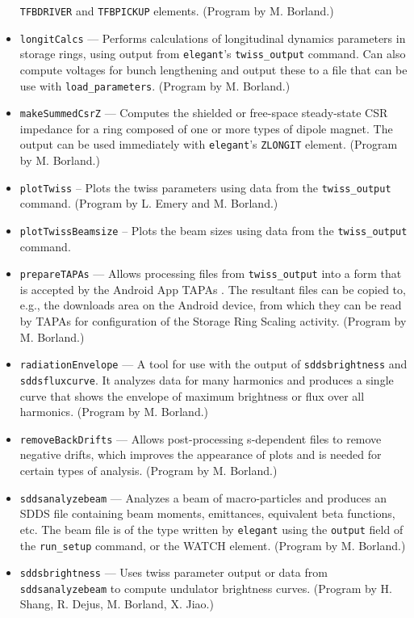 \documentclass[11pt]{article}
\begin{document}
\begin{itemize}
  \verb|TFBDRIVER| and \verb|TFBPICKUP| elements.
  (Program by M. Borland.)
\item {\tt longitCalcs} --- Performs calculations of longitudinal dynamics parameters in storage rings,
  using output from \verb|elegant|'s \verb|twiss_output| command. Can also compute voltages for
  bunch lengthening and output these to a file that can be use with \verb|load_parameters|.
  (Program by M. Borland.)
\item {\tt makeSummedCsrZ} --- Computes the shielded or free-space steady-state CSR impedance for a ring
  composed of one or more types of dipole magnet.
 The output can be used immediately with {\tt elegant}'s \verb|ZLONGIT| element.
  (Program by M. Borland.)
\item {\tt plotTwiss} -- Plots the twiss parameters using data from the \verb|twiss_output| command.
  (Program by L. Emery and M. Borland.)
\item {\tt plotTwissBeamsize} -- Plots the beam sizes using data from the \verb|twiss_output| command.
\item {\tt prepareTAPAs} --- Allows processing files from \verb|twiss_output| into a form
  that is accepted by the Android App TAPAs \cite{TAPAs}. The resultant files can be copied to, e.g., 
  the downloads area on the Android device, from which they can be read by TAPAs for configuration of
  the Storage Ring Scaling activity.
  (Program by M. Borland.)
\item {\tt radiationEnvelope} --- A tool for use with the output of {\tt sddsbrightness} and {\tt sddsfluxcurve}.
  It analyzes data for many harmonics and produces a single curve that shows the envelope of maximum
  brightness or flux over all harmonics.
  (Program by M. Borland.)
\item {\tt removeBackDrifts} --- Allows post-processing s-dependent files to remove negative drifts, which
  improves the appearance of plots and is needed for certain types of analysis.
  (Program by M. Borland.)
\item {\tt sddsanalyzebeam} --- Analyzes a beam of macro-particles and produces an SDDS file
        containing beam moments, emittances, equivalent beta functions, etc.  The beam file
        is of the type written by {\tt elegant} using the {\tt output} field of the {\tt run\_setup}
        command, or the WATCH element.  (Program by M. Borland.)
\item {\tt sddsbrightness} --- Uses twiss parameter output or data from {\tt sddsanalyzebeam} to
  compute undulator brightness curves.  (Program by H. Shang, R. Dejus, M. Borland, X. Jiao.)

\end{itemize}
\end{document}
